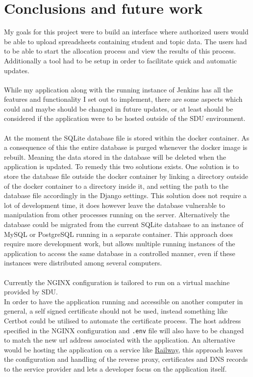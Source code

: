 \section{Conclusions and future work}\label{conclusion}
My goals for this project were to build an interface where authorized users would be able to upload spreadsheets containing student and topic data. The users had to be able to start the allocation process and view the results of this process. Additionally a tool had to be setup in order to facilitate quick and automatic updates.\\\\
While my application along with the running instance of Jenkins has all the features and functionality I set out to implement, there are some aspects which could and maybe should be changed in future updates, or at least should be considered if the application were to be hosted outside of the SDU environment.\\\\
At the moment the SQLite database file is stored within the docker container. As a consequence of this the entire database is purged whenever the docker image is rebuilt. Meaning the data stored in the database will be deleted when the application is updated. To remedy this two solutions exists. One solution is to store the database file outside the docker container by linking a directory outside of the docker container to a directory inside it, and setting the path to the database file accordingly in the Django settings. This solution does not require a lot of development time, it does however leave the database vulnerable to manipulation from other processes running on the server. Alternatively the database could be migrated from the current SQLite database to an instance of MySQL or PostgreSQL running in a separate container. This approach does require more development work, but allows multiple running instances of the application to access the same database in a controlled manner, even if these instances were distributed among several computers.\\\\
Currently the NGINX configuration is tailored to run on a virtual machine provided by SDU.\\
In order to have the application running and accessible on another computer in general, a self signed certificate should not be used, instead something like Certbot could be utilised to automate the certificate process. The host address specified in the NGINX configuration and \verb|.env| file will also have to be changed to match the new url address associated with the application. An alternative would be hosting the application on a service like \href{https://railway.app/}{Railway}, this approach leaves the configuration and handling of the reverse proxy, certificates and DNS records to the service provider and lets a developer focus on the application itself.\\\\
